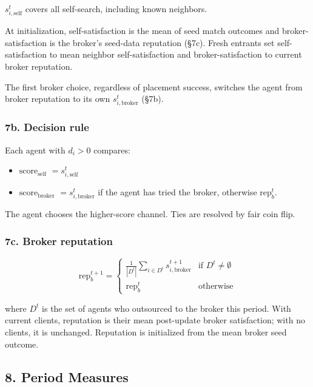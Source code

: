 \documentclass[11pt]{article}
\providecommand{\tightlist}{%
  \setlength{\itemsep}{0pt}\setlength{\parskip}{0pt}}
\begin{document}
\(s_{i,\text{self}}^t\) covers all self-search, including known neighbors.

At initialization, self-satisfaction is the mean of seed match outcomes and broker-satisfaction is the broker's seed-data reputation (§7c). Fresh entrants set self-satisfaction to mean neighbor self-satisfaction and broker-satisfaction to current broker reputation.

The first broker choice, regardless of placement success, switches the agent from broker reputation to its own \(s_{i,\text{broker}}^t\) (§7b).

\subsubsection{7b. Decision rule}\label{b.-decision-rule}

Each agent with \(d_i > 0\) compares:

\begin{itemize}
\tightlist
\item
  \textbf{\(\text{score}_{\text{self}}\)} \(= s_{i,\text{self}}^t\)
\item
  \textbf{\(\text{score}_{\text{broker}}\)} \(= s_{i,\text{broker}}^t\) if the agent has tried the broker, otherwise \(\text{rep}_b^t\).
\end{itemize}

The agent chooses the higher-score channel. Ties are resolved by fair coin flip.

\subsubsection{7c. Broker reputation}\label{c.-broker-reputation}

\[\text{rep}_b^{t+1} = \begin{cases} \frac{1}{|D^t|} \sum_{i \in D^t} s_{i,\text{broker}}^{t+1} & \text{if } D^t \neq \emptyset \\[4pt] \text{rep}_b^{t} & \text{otherwise} \end{cases}\]

where \(D^t\) is the set of agents who outsourced to the broker this period. With current clients, reputation is their mean post-update broker satisfaction; with no clients, it is unchanged. Reputation is initialized from the mean broker seed outcome.

\subsection{8. Period Measures}\label{period-measures}
\end{document}
